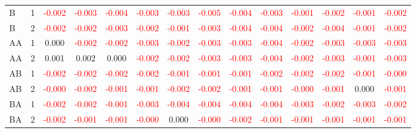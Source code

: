 \begin{table}[!htb]
{\begin{tabular}{llcccccccccccc}
B & 1 & \textcolor{red}{-0.002} & \textcolor{red}{-0.003} & \textcolor{red}{-0.004} & \textcolor{red}{-0.003} & \textcolor{red}{-0.003} & \textcolor{red}{-0.005} & \textcolor{red}{-0.004} & \textcolor{red}{-0.003} & \textcolor{red}{-0.001} & \textcolor{red}{-0.002} & \textcolor{red}{-0.001} & \textcolor{red}{-0.002}\\
B & 2 & \textcolor{red}{-0.002} & \textcolor{red}{-0.002} & \textcolor{red}{-0.003} & \textcolor{red}{-0.002} & \textcolor{red}{-0.001} & \textcolor{red}{-0.003} & \textcolor{red}{-0.004} & \textcolor{red}{-0.004} & \textcolor{red}{-0.002} & \textcolor{red}{-0.004} & \textcolor{red}{-0.001} & \textcolor{red}{-0.002}\\
AA & 1 & 0.000 & \textcolor{red}{-0.002} & \textcolor{red}{-0.002} & \textcolor{red}{-0.003} & \textcolor{red}{-0.002} & \textcolor{red}{-0.003} & \textcolor{red}{-0.003} & \textcolor{red}{-0.004} & \textcolor{red}{-0.002} & \textcolor{red}{-0.003} & \textcolor{red}{-0.003} & \textcolor{red}{-0.003}\\
AA & 2 & 0.001 & 0.002 & 0.000 & \textcolor{red}{-0.002} & \textcolor{red}{-0.002} & \textcolor{red}{-0.003} & \textcolor{red}{-0.003} & \textcolor{red}{-0.004} & \textcolor{red}{-0.002} & \textcolor{red}{-0.003} & \textcolor{red}{-0.001} & \textcolor{red}{-0.003}\\
AB & 1 & \textcolor{red}{-0.002} & \textcolor{red}{-0.002} & \textcolor{red}{-0.002} & \textcolor{red}{-0.002} & \textcolor{red}{-0.001} & \textcolor{red}{-0.001} & \textcolor{red}{-0.001} & \textcolor{red}{-0.002} & \textcolor{red}{-0.002} & \textcolor{red}{-0.002} & \textcolor{red}{-0.001} & \textcolor{red}{-0.000}\\
AB & 2 & \textcolor{red}{-0.000} & \textcolor{red}{-0.002} & \textcolor{red}{-0.001} & \textcolor{red}{-0.001} & \textcolor{red}{-0.002} & \textcolor{red}{-0.002} & \textcolor{red}{-0.001} & \textcolor{red}{-0.001} & \textcolor{red}{-0.000} & \textcolor{red}{-0.001} & 0.000 & \textcolor{red}{-0.001}\\
BA & 1 & \textcolor{red}{-0.002} & \textcolor{red}{-0.002} & \textcolor{red}{-0.001} & \textcolor{red}{-0.003} & \textcolor{red}{-0.004} & \textcolor{red}{-0.004} & \textcolor{red}{-0.004} & \textcolor{red}{-0.004} & \textcolor{red}{-0.003} & \textcolor{red}{-0.002} & \textcolor{red}{-0.003} & \textcolor{red}{-0.002}\\
BA & 2 & \textcolor{red}{-0.002} & \textcolor{red}{-0.001} & \textcolor{red}{-0.001} & \textcolor{red}{-0.000} & 0.000 & \textcolor{red}{-0.000} & \textcolor{red}{-0.002} & \textcolor{red}{-0.001} & \textcolor{red}{-0.001} & \textcolor{red}{-0.001} & \textcolor{red}{-0.001} & \textcolor{red}{-0.001}\\

\end{tabular}}
\end{table}
